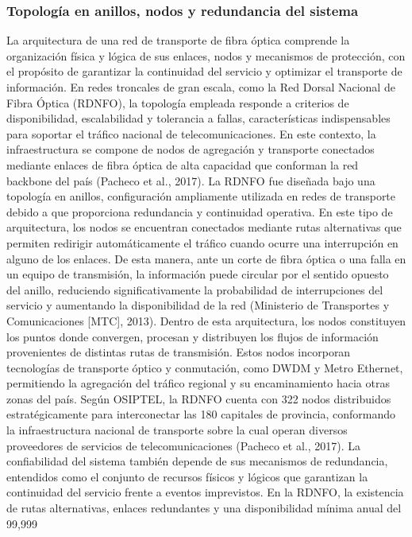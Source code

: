 \subsubsection{Topología en anillos, nodos y redundancia del sistema}
La arquitectura de una red de transporte de fibra óptica comprende la organización física y lógica de sus enlaces, nodos y mecanismos de protección, con el propósito de garantizar la continuidad del servicio y optimizar el transporte de información. En redes troncales de gran escala, como la Red Dorsal Nacional de Fibra Óptica (RDNFO), la topología empleada responde a criterios de disponibilidad, escalabilidad y tolerancia a fallas, características indispensables para soportar el tráfico nacional de telecomunicaciones. En este contexto, la infraestructura se compone de nodos de agregación y transporte conectados mediante enlaces de fibra óptica de alta capacidad que conforman la red backbone del país (Pacheco et al., 2017). 
La RDNFO fue diseñada bajo una topología en anillos, configuración ampliamente utilizada en redes de transporte debido a que proporciona redundancia y continuidad operativa. En este tipo de arquitectura, los nodos se encuentran conectados mediante rutas alternativas que permiten redirigir automáticamente el tráfico cuando ocurre una interrupción en alguno de los enlaces. De esta manera, ante un corte de fibra óptica o una falla en un equipo de transmisión, la información puede circular por el sentido opuesto del anillo, reduciendo significativamente la probabilidad de interrupciones del servicio y aumentando la disponibilidad de la red (Ministerio de Transportes y Comunicaciones [MTC], 2013). 
Dentro de esta arquitectura, los nodos constituyen los puntos donde convergen, procesan y distribuyen los flujos de información provenientes de distintas rutas de transmisión. Estos nodos incorporan tecnologías de transporte óptico y conmutación, como DWDM y Metro Ethernet, permitiendo la agregación del tráfico regional y su encaminamiento hacia otras zonas del país. Según OSIPTEL, la RDNFO cuenta con 322 nodos distribuidos estratégicamente para interconectar las 180 capitales de provincia, conformando la infraestructura nacional de transporte sobre la cual operan diversos proveedores de servicios de telecomunicaciones (Pacheco et al., 2017). 
La confiabilidad del sistema también depende de sus mecanismos de redundancia, entendidos como el conjunto de recursos físicos y lógicos que garantizan la continuidad del servicio frente a eventos imprevistos. En la RDNFO, la existencia de rutas alternativas, enlaces redundantes y una disponibilidad mínima anual del 99,999 %

